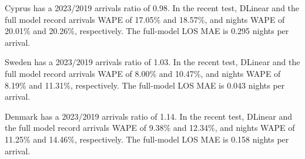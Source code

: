 Cyprus has a 2023/2019 arrivals ratio of 0.98. In the recent test, DLinear and the full model record arrivals WAPE of 17.05\% and 18.57\%, and nights WAPE of 20.01\% and 20.26\%, respectively. The full-model LOS MAE is 0.295 nights per arrival.

Sweden has a 2023/2019 arrivals ratio of 1.03. In the recent test, DLinear and the full model record arrivals WAPE of 8.00\% and 10.47\%, and nights WAPE of 8.19\% and 11.31\%, respectively. The full-model LOS MAE is 0.043 nights per arrival.

Denmark has a 2023/2019 arrivals ratio of 1.14. In the recent test, DLinear and the full model record arrivals WAPE of 9.38\% and 12.34\%, and nights WAPE of 11.25\% and 14.46\%, respectively. The full-model LOS MAE is 0.158 nights per arrival.
